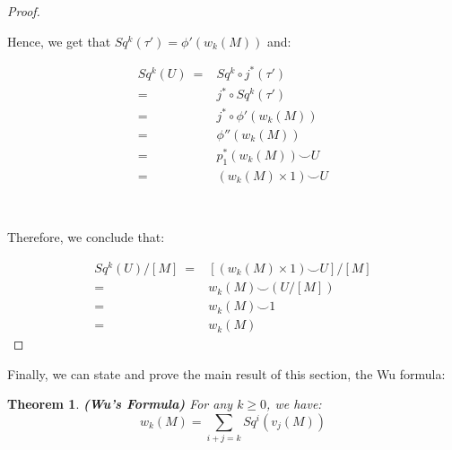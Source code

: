 \documentclass[12pt,oneside]{book}
\newtheorem{teo}    {Theorem}[chapter]
\newcommand{\ds}{\displaystyle}
\newcommand{\ccup}{\smile}
\begin{document}
\begin{proof}
        \

        Hence, we get that $Sq^{k}(\tau') = \phi'(w_{k}(M))$ and:

        $$
        \begin{array}{rl}
        	Sq^{k}(U) \ = & Sq^{k} \circ j^{*}(\tau') \\
        	= & j^{*} \circ Sq^{k}(\tau') \\
        	= & j^{*} \circ \phi'(w_{k}(M)) \\
        	= & \phi''(w_{k}(M)) \\
        	= & p_{1}^{*}(w_{k}(M)) \ccup U \\
        	= & (w_{k}(M) \times 1) \ccup U
        \end{array}
        $$

        \

        Therefore, we conclude that:

        $$
        \begin{array}{rl}
        	Sq^{k}(U)/[M] \ = & \left[ (w_{k}(M) \times 1) \ccup U \right]/[M] \\
        	= & w_{k}(M) \ccup \left( U / [M] \right) \\
        	= & w_{k}(M) \ccup 1 \\
        	= & w_{k}(M)
        \end{array}
        $$

    \end{proof}

    Finally, we can state and prove the main result of this section, the Wu formula:

    \begin{teo}{\bf (Wu's Formula)}
    	For any $k \geq 0$, we have:
    	$$ w_{k}(M) = \ds\sum_{i+j=k} Sq^{i}(v_{j}(M)) $$
    \end{teo}
\end{document}
